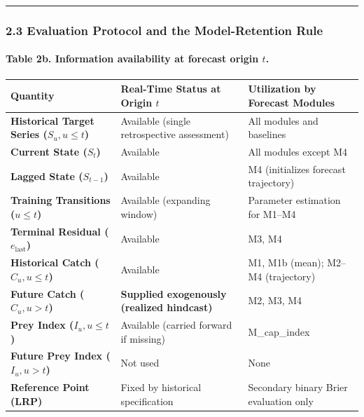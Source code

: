\documentclass[11pt]{article}
\begin{document}
\begin{center}\rule{0.5\linewidth}{0.5pt}\end{center}

\subsubsection{2.3 Evaluation Protocol and the Model-Retention
Rule}\label{evaluation-protocol-and-the-model-retention-rule}

\paragraph{\texorpdfstring{Table 2b. Information availability at
forecast origin
\(t\).}{Table 2b. Information availability at forecast origin t.}}\label{table-2b.-information-availability-at-forecast-origin-t.}

{\def\LTcaptype{none} %
\begin{longtable}[]{@{}
  >{\raggedright\arraybackslash}p{}
  >{\raggedright\arraybackslash}p{}
  >{\raggedright\arraybackslash}p{}@{}}
\toprule\noalign{}
\begin{minipage}[b]{\linewidth}\raggedright
Quantity
\end{minipage} & \begin{minipage}[b]{\linewidth}\raggedright
Real-Time Status at Origin \(t\)
\end{minipage} & \begin{minipage}[b]{\linewidth}\raggedright
Utilization by Forecast Modules
\end{minipage} \\
\midrule\noalign{}
\endhead
\bottomrule\noalign{}
\endlastfoot
\textbf{Historical Target Series (\(S_u, u \le t\))} & Available (single
retrospective assessment) & All modules and baselines \\
\textbf{Current State (\(S_t\))} & Available & All modules except M4 \\
\textbf{Lagged State (\(S_{t-1}\))} & Available & M4 (initializes
forecast trajectory) \\
\textbf{Training Transitions (\(u \le t\))} & Available (expanding
window) & Parameter estimation for M1--M4 \\
\textbf{Terminal Residual (\(e_{\mathrm{last}}\))} & Available & M3,
M4 \\
\textbf{Historical Catch (\(C_u, u \le t\))} & Available & M1, M1b
(mean); M2--M4 (trajectory) \\
\textbf{Future Catch (\(C_u, u > t\))} & \textbf{Supplied exogenously
(realized hindcast)} & M2, M3, M4 \\
\textbf{Prey Index (\(I_u, u \le t\))} & Available (carried forward if
missing) & M\_cap\_index \\
\textbf{Future Prey Index (\(I_u, u > t\))} & Not used & None \\
\textbf{Reference Point (LRP)} & Fixed by historical specification &
Secondary binary Brier evaluation only \\
\end{longtable}
}
\end{document}
